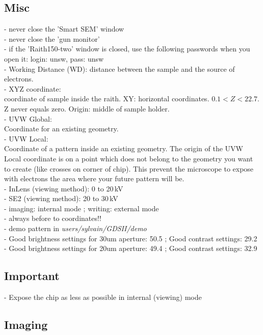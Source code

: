 \documentclass[12pt,a4paper]{report}
\begin{document}
\begin{enumerate}
\subsection{Misc}
- never close the 'Smart SEM' window\\
- never close the 'gun monitor'\\
- if the 'Raith150-two' window is closed, use the following passwords when you open it: login: unsw, pass: unsw\\
- Working Distance (WD): distance between the sample and the source of electrons. \\
- XYZ coordinate:\\
coordinate of sample inside the raith. XY: horizontal coordinates. $0.1<Z<22.7$. Z never equals zero. Origin: middle of sample holder. \\
- UVW Global:\\
Coordinate for an existing geometry.\\
- UVW Local:\\
Coordinate of a pattern inside an existing geometry. The origin of the UVW Local coordinate is on a point which does not belong to the geometry you want to create (like crosses on corner of chip). This prevent the microscope to expose with electrons the area where your future pattern will be.\\
- InLens (viewing method): 0 to 20\,kV\\
- SE2 (viewing method): 20 to 30\,kV\\
- imaging: internal mode ; writing: external mode\\
- always  before  to coordinates!!\\
- demo pattern in \textit{users/sylvain/GDSII/demo} \\
- Good brightness settings for 30um aperture: 50.5 ; Good contrast settings: 29.2\\
- Good brightness settings for 20um aperture: 49.4 ; Good contrast settings: 32.9\\
 
\subsection{Important}

- Expose the chip as less as possible in internal (viewing) mode\\

\subsection{Imaging}


\end{enumerate}
\end{document}
